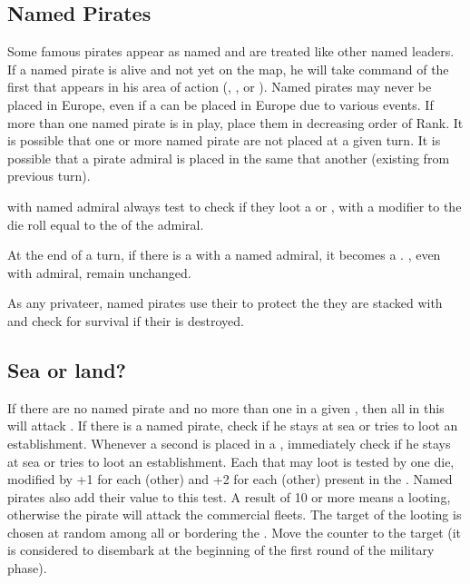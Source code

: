 \subsection{Named Pirates}\label{chEvents:Named Pirates}

\aparag Some famous pirates appear as named  \LeaderA and
are treated like other named leaders.
\bparag If a named pirate is alive and not yet on the map, he will take
command of the first \PIRATE that appears in his area of action
(, , or \ROTW).
\bparag Named pirates may never be placed in Europe, even if a \PIRATE
can be placed in Europe due to various events.
\bparag If more than one named pirate is in play, place them in
decreasing order of Rank. It is possible that one or more named pirate
are not placed at a given turn. It is possible that a pirate admiral is
placed in the same \STZ that another (existing from previous turn).

\aparag \PIRATE with named admiral always test to check if they loot a
\TP or \COL, with a modifier to the die roll equal to the 
of the admiral.

\aparag At the end of a turn, if there is a \PIRATE\facemoins with a
named admiral, it becomes a \PIRATE\faceplus. \PIRATE\faceplus, even
with admiral, remain unchanged.

\aparag As any privateer, named pirates use their  to
protect the \PIRATE they are stacked with and check for survival if
their \PIRATE is destroyed.



\subsection{Sea or land?}\label{chEvents:PiracyTarget}

\aparag If there are no named pirate and no more than one
\PIRATE\faceplus in a given \STZ, then all \PIRATE in this \STZ will
attack \TradeFLEET.
\bparag If there is a named pirate, check if he stays at sea or tries to
loot an establishment.
\bparag Whenever a second \PIRATE\faceplus is placed in a \STZ,
immediately check if he stays at sea or tries to loot an establishment.
\aparag Each \PIRATE that may loot is tested by one die, modified by +1
for each (other) \PIRATE\facemoins and +2 for each (other)
\PIRATE\faceplus present in the \STZ.
\bparag Named pirates also add their  value to this test.
\bparag A result of 10 or more means a looting, otherwise the pirate
will attack the commercial fleets.
\bparag The target of the looting is chosen at random among all \TP or
\COL bordering the \STZ. Move the counter to the target (it is
considered to disembark at the beginning of the first round of the
military phase).




